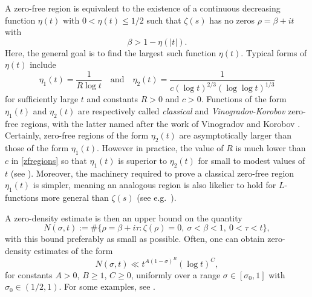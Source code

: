 \documentclass[reqno]{amsart}
\numberwithin{equation}{section}
\theoremstyle{remark}
\begin{document}
A zero-free region is equivalent to the existence of a continuous decreasing function $\eta(t)$ with $0<\eta(t)\leq 1/2$ such that $\zeta(s)$ has no zeros $\rho=\beta+it$ with
\begin{equation*}
    \beta>1-\eta(|t|).
\end{equation*}
Here, the general goal is to find the largest such function $\eta(t)$. Typical forms of $\eta(t)$ include
\begin{equation}\label{zfregions}
    \eta_1(t)=\frac{1}{R\log t}\quad\text{and}\quad\eta_2(t)=\frac{1}{c(\log t)^{2/3}(\log\log t)^{1/3}}    
\end{equation}
for sufficiently large $t$ and constants $R>0$ and $c>0$. Functions of the form $\eta_1(t)$ and $\eta_2(t)$ are respectively called \emph{classical} and \emph{Vinogradov-Korobov} zero-free regions, with the latter named after the work of Vinogradov \cite{vinogradov1958new} and Korobov \cite{korobov1958estimates}. Certainly, zero-free regions of the form $\eta_2(t)$ are asymptotically larger than those of the form $\eta_1(t)$. However in practice, the value of $R$ is much lower than $c$ in \eqref{zfregions} so that $\eta_1(t)$ is superior to $\eta_2(t)$ for small to modest values of $t$ (see \cite{mossinghoff2024explicit}). Moreover, the machinery required to prove a classical zero-free region $\eta_1(t)$ is simpler, meaning an analogous region is also likelier to hold for $L$-functions more general than $\zeta(s)$ (see e.g.\ \cite[Theorem 1.9]{weiss1983least}).

A zero-density estimate is then an upper bound on the quantity
\begin{equation}\label{zerodendef}
    N(\sigma,t):=\#\{\rho=\beta+i\tau:\zeta(\rho)=0,\:\sigma<\beta<1,\: 0<\tau<t\},
\end{equation}
with this bound preferably as small as possible. Often, one can obtain zero-density estimates of the form
\begin{equation}
    N(\sigma,t)\ll t^{A(1-\sigma)^B}(\log t)^C,
\end{equation}
for constants $A>0$, $B\geq 1$, $C\geq 0$, uniformly over a range $\sigma\in[\sigma_0,1]$ with $\sigma_0\in(1/2,1)$. For some examples, see \cite[Chapter 11]{ivic2003riemann}.
\end{document}
